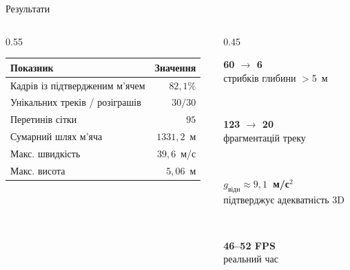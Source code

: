 \documentclass[aspectratio=169,11pt]{beamer}
\newcommand{\bignum}[2]{%
  \begin{minipage}{\linewidth}\centering
    {\color{accent}\Large\textbf{#1}}\\[2pt]{\footnotesize #2}
  \end{minipage}}
\begin{document}
\begin{frame}{Результати}
  \begin{columns}[T]
    \begin{column}{0.55\textwidth}
      \centering\footnotesize
      \begin{tabular}{@{}lr@{}}
        \toprule
        \textbf{Показник} & \textbf{Значення} \\
        \midrule
        Кадрів із підтвердженим м'ячем & $82{,}1\%$ \\
        Унікальних треків / розіграшів  & $30 / 30$ \\
        Перетинів сітки                 & $95$ \\
        Сумарний шлях м'яча             & $1331{,}2$~м \\
        Макс. швидкість                 & $39{,}6$~м/с \\
        Макс. висота                    & $5{,}06$~м \\
        \bottomrule
      \end{tabular}
    \end{column}
    \begin{column}{0.45\textwidth}
      \bignum{60 $\rightarrow$ 6}{стрибків глибини $>$5~м}\\[6pt]
      \bignum{123 $\rightarrow$ 20}{фрагментацій треку}\\[6pt]
      \bignum{$g_{\text{відн}}\approx 9{,}1$~м/с$^2$}{підтверджує адекватність 3D}\\[6pt]
      \bignum{46–52 FPS}{реальний час}
    \end{column}
  \end{columns}
\end{frame}
\end{document}
